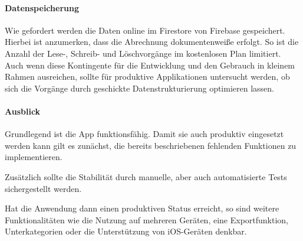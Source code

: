 \paragraph{Datenspeicherung}
Wie gefordert werden die Daten online im Firestore von Firebase gespeichert.
Hierbei ist anzumerken, dass die Abrechnung dokumentenweiße erfolgt.
So ist die Anzahl der Lese-, Schreib- und Löschvorgänge im kostenlosen Plan limitiert.
Auch wenn diese Kontingente für die Entwicklung und den Gebrauch in kleinem Rahmen ausreichen,
sollte für produktive Applikationen untersucht werden,
ob sich die Vorgänge durch geschickte Datenstrukturierung optimieren lassen.

\paragraph{Ausblick}
Grundlegend ist die App funktionsfähig.
Damit sie auch produktiv eingesetzt werden kann gilt es zunächst,
die bereits beschriebenen fehlenden Funktionen zu implementieren.

Zusätzlich sollte die Stabilität durch manuelle,
aber auch automatisierte Tests sichergestellt werden.

Hat die Anwendung dann einen produktiven Status erreicht,
so sind weitere Funktionalitäten wie die Nutzung auf mehreren Geräten, eine Exportfunktion,
Unterkategorien oder die Unterstützung von iOS-Geräten denkbar.